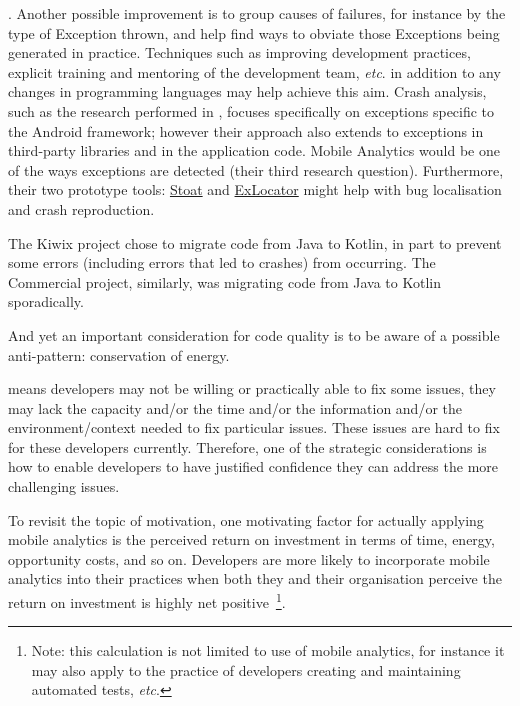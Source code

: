 . 
Another possible improvement is to group causes of failures, for instance by the type of Exception thrown, and help find ways to obviate those Exceptions being generated in practice. Techniques such as improving development practices, explicit training and mentoring of the development team, \emph{etc}. in addition to any changes in programming languages may help achieve this aim. %
Crash analysis, such as the research performed in \citet{su2020_why_my_app_crashes_etc_android_framework_exceptions}, focuses specifically on exceptions specific to the Android framework; however their approach also extends to exceptions in third-party libraries and in the application code. Mobile Analytics would be one of the ways exceptions are detected (their third research question). Furthermore, their two prototype tools: \href{https://github.com/tingsu/Stoat}{Stoat} and \href{https://github.com/crashanalysis/ExLocator}{ExLocator} might help with bug localisation and crash reproduction.

The Kiwix project chose to migrate code from Java to Kotlin, in part to prevent some errors (including errors that led to crashes) from occurring. The Commercial project, similarly, was migrating code from Java to Kotlin sporadically.


And yet an important consideration for code quality is to be aware of a possible anti-pattern: conservation of energy.

means developers may not be willing or practically able to fix some issues, they may lack the capacity and/or the time and/or the information and/or the environment/context needed to fix particular issues. These issues are hard to fix for these developers currently.
%
Therefore, one of the strategic considerations is how to enable developers to have justified confidence they can address the more challenging issues.

To revisit the topic of motivation, one motivating factor for actually applying mobile analytics is the perceived return on investment in terms of time, energy, opportunity costs, and so on. Developers are more likely to incorporate mobile analytics into their practices when both they and their organisation perceive the return on investment is highly net positive~\footnote{Note: this calculation is not limited to use of mobile analytics, for instance it may also apply to the practice of developers creating and maintaining automated tests, \textit{etc}.}.

